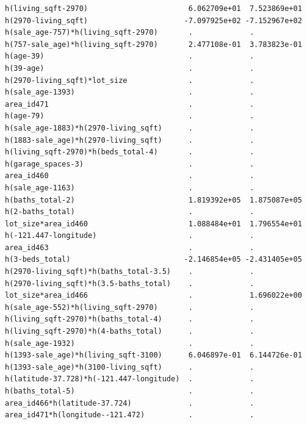 \documentclass[
]{article}
\begin{document}
\begin{verbatim}
h(living_sqft-2970)                       6.062709e+01  7.523869e+01
h(2970-living_sqft)                      -7.097925e+02 -7.152967e+02
h(sale_age-757)*h(living_sqft-2970)       .             .           
h(757-sale_age)*h(living_sqft-2970)       2.477108e-01  3.783823e-01
h(age-39)                                 .             .           
h(39-age)                                 .             .           
h(2970-living_sqft)*lot_size              .             .           
h(sale_age-1393)                          .             .           
area_id471                                .             .           
h(age-79)                                 .             .           
h(sale_age-1883)*h(2970-living_sqft)      .             .           
h(1883-sale_age)*h(2970-living_sqft)      .             .           
h(living_sqft-2970)*h(beds_total-4)       .             .           
h(garage_spaces-3)                        .             .           
area_id460                                .             .           
h(sale_age-1163)                          .             .           
h(baths_total-2)                          1.819392e+05  1.875087e+05
h(2-baths_total)                          .             .           
lot_size*area_id460                       1.088484e+01  1.796554e+01
h(-121.447-longitude)                     .             .           
area_id463                                .             .           
h(3-beds_total)                          -2.146854e+05 -2.431405e+05
h(2970-living_sqft)*h(baths_total-3.5)    .             .           
h(2970-living_sqft)*h(3.5-baths_total)    .             .           
lot_size*area_id466                       .             1.696022e+00
h(sale_age-552)*h(living_sqft-2970)       .             .           
h(living_sqft-2970)*h(baths_total-4)      .             .           
h(living_sqft-2970)*h(4-baths_total)      .             .           
h(sale_age-1932)                          .             .           
h(1393-sale_age)*h(living_sqft-3100)      6.046897e-01  6.144726e-01
h(1393-sale_age)*h(3100-living_sqft)      .             .           
h(latitude-37.728)*h(-121.447-longitude)  .             .           
h(baths_total-5)                          .             .           
area_id466*h(latitude-37.724)             .             .           
area_id471*h(longitude--121.472)          .             .           
                                                                    

\end{verbatim}
\end{document}
